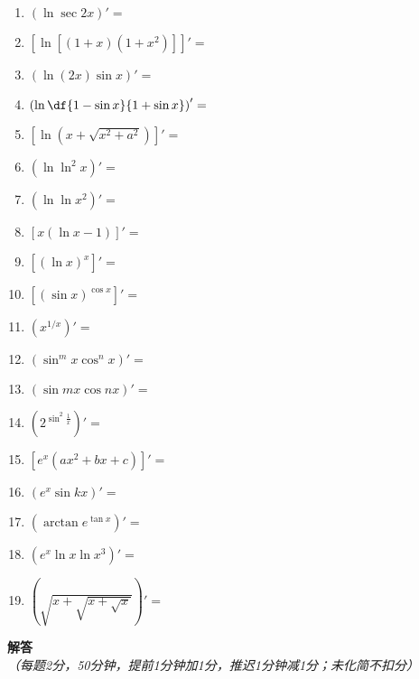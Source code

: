 \begin{enumerate}
  \item $\left(\ln\sec 2x\right)'=$
  \item $\left[\ln[(1+x)(1+x^2)]\right]'=$
  \item $\left(\ln (2x)\sin x\right)'=$
  \item $\left(\ln\df{1-\sin x}{1+\sin x}\right)'=$
  \item $\left[\ln(x+\sqrt{x^2+a^2})\right]'=$
  \item $\left(\ln\ln^2x\right)'=$
  \item $\left(\ln\ln x^2\right)'=$
  \item $\left[x(\ln x-1)\right]'=$
  \item $\left[(\ln x)^x\right]'=$
  \item $\left[(\sin x)^{\cos x}\right]'=$
  \item $\left(x^{1/x}\right)'=$
  \item $\left(\sin^mx\cos^nx\right)'=$
  \item $\left(\sin mx\cos nx\right)'=$
  \item $\left(2^{\sin^2\frac1x}\right)'=$
  \item $\left[e^x(ax^2+bx+c)\right]'=$
  \item $\left(e^x\sin kx\right)'=$
  \item $\left(\arctan e^{\tan x}\right)'=$
  \item $\left(e^x\ln x\ln x^3\right)'=$
  \item $\left(\sqrt{x+\sqrt{x+\sqrt{x}}}\right)'=$
\end{enumerate}

\newpage

\begin{center}
	{{\Large\bf 解\quad 答}}\\
	
	{\it（每题2分，50分钟，提前1分钟加1分，推迟1分钟减1分；未化简不扣分）}
\end{center}

